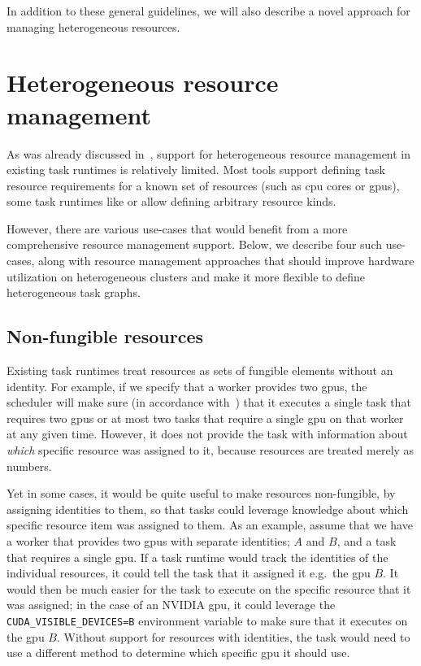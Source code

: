 In addition to these general guidelines, we will also describe a novel approach for managing
heterogeneous resources.

\section{Heterogeneous resource management}
\label{sec:heterogeneous-resources}
As was already discussed in~, support for heterogeneous resource management
in existing task runtimes is relatively limited. Most tools support defining task resource
requirements for a known set of resources (such as \gls{cpu} cores or
\glspl{gpu}), some task runtimes like \dask{} or
\snakemake{} allow defining arbitrary resource kinds.

However, there are various use-cases that would benefit from a more comprehensive resource
management support. Below, we describe four such use-cases, along with resource management
approaches that should improve hardware utilization on heterogeneous clusters and make it more
flexible to define heterogeneous task graphs.

\subsection{Non-fungible resources}
Existing task runtimes treat resources as sets of fungible elements without an identity. For
example, if we specify that a \dask{} worker provides two \glspl{gpu},
the \dask{} scheduler will make sure (in accordance with~)
that it executes a single task that requires two \glspl{gpu} or at most two tasks that
require a single \gls{gpu} on that worker at any given time. However, it does not
provide the task with information about \emph{which} specific resource was assigned to
it, because resources are treated merely as numbers.

Yet in some cases, it would be quite useful to make resources non-fungible, by assigning identities
to them, so that tasks could leverage knowledge about which specific resource item was assigned to
them. As an example, assume that we have a worker that provides two \glspl{gpu} with
separate identities; $A$ and $B$, and a task that requires a
single \gls{gpu}. If a task runtime would track the identities of the individual
resources, it could tell the task that it assigned it e.g.\ the \gls{gpu}
$B$. It would then be much easier for the task to execute on the specific
resource that it was assigned; in the case of an NVIDIA \gls{gpu}, it could leverage
the \texttt{CUDA\_VISIBLE\_DEVICES=B} environment variable to make sure that it executes on the
\gls{gpu} $B$. Without support for resources with identities, the
task would need to use a different method to determine which specific \gls{gpu} it
should use.

